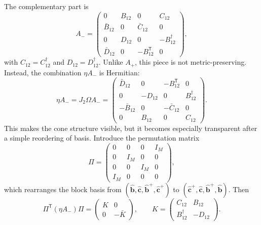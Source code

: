 \documentclass[twocolumn,aps,prb,10pt,amsmath,amssymb,amsthm,superscriptaddress]{revtex4-2}
\newcommand{\trans}{\mathsf{T}}
\newcommand{\hc}{\dagger}
\newcommand{\bb}[1]{\bm{#1}}
\theoremstyle{remark}
\begin{document}
The complementary part is
\begin{equation}
    A_{-}=
    \begin{pmatrix}
        0 & B_{12} & 0 & C_{12} \\
        \bar B_{12} & 0 & \bar C_{12} & 0 \\
        0 & D_{12} & 0 & -B_{12}^{\hc} \\
        \bar D_{12} & 0 & -B_{12}^\trans & 0
    \end{pmatrix},
    \label{eq:Aminus_form}
\end{equation}
with $C_{12}=C_{12}^{\hc}$ and $D_{12}=D_{12}^{\hc}$. Unlike $A_{+}$, this piece is not metric-preserving. Instead, the combination $\eta A_{-}$ is Hermitian:
\begin{equation}
    \eta A_{-} = J_2\Omega A_{-} =
    \begin{pmatrix}
        \bar D_{12} & 0 & -B_{12}^\trans & 0 \\
        0 & -D_{12} & 0 & B_{12}^{\hc} \\
        -\bar B_{12} & 0 & -\bar C_{12} & 0 \\
        0 & B_{12} & 0 & C_{12}
    \end{pmatrix}.
    \label{eq:etaAminus}
\end{equation}
This makes the cone structure visible, but it becomes especially transparent after a simple reordering of basis. Introduce the permutation matrix
\begin{equation}
    \Pi=
    \begin{pmatrix}
        0 & 0 & 0 & I_M \\
        0 & I_M & 0 & 0 \\
        0 & 0 & I_M & 0 \\
        I_M & 0 & 0 & 0
    \end{pmatrix},
\end{equation}
which rearranges the block basis from $(\hat{\bb b},\hat{\bb c},\hat{\bb b}^+,\hat{\bb c}^+)$ to $(\hat{\bb c}^+,\hat{\bb c},\hat{\bb b}^+,\hat{\bb b})$. Then
\begin{equation}
    \Pi^\trans (\eta A_{-}) \Pi =
    \begin{pmatrix}
        K & 0 \\
        0 & -\bar K
    \end{pmatrix},
    \qquad
    K =
    \begin{pmatrix}
        C_{12} & B_{12} \\
        B_{12}^{\hc} & -D_{12}
    \end{pmatrix}.
    \label{eq:etaAminus_diag}
\end{equation}
\end{document}
